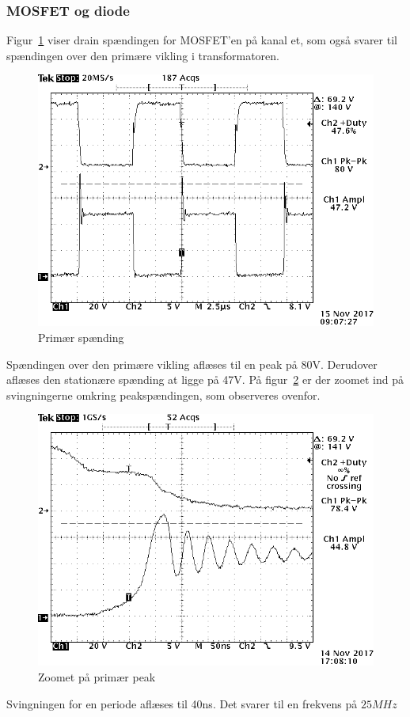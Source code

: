\subsubsection{MOSFET og diode}
Figur~\ref{fig: privolt} viser drain spændingen for MOSFET'en på kanal et, som også svarer til spændingen over den primære vikling i transformatoren.
\begin{figure}[H]
	\center
	\includegraphics[max width=0.7\linewidth]{../dokumentation/tex/2iteration/billeder/Realisering/Transformator_Primar.png}
	\caption{Primær spænding}
	\label{fig: privolt}
\end{figure}
Spændingen over den primære vikling aflæses til en peak på 80V. Derudover aflæses den stationære spænding at ligge på 47V. 
På figur~\ref{fig: prizoom} er der zoomet ind på svingningerne omkring peakspændingen, som observeres ovenfor.
\begin{figure}[H]
	\center
	\includegraphics[max width=0.7\linewidth]{../dokumentation/tex/2iteration/billeder/Realisering/Transformator_Primarzoom.png}
	\caption{Zoomet på primær peak}
	\label{fig: prizoom}
\end{figure}
Svingningen for en periode aflæses til 40ns. Det svarer til en frekvens på $25MHz$

